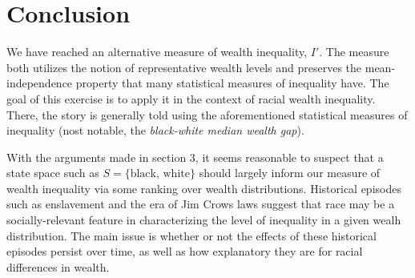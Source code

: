 \documentclass[\econtexRoot/IneqMeas]{subfiles}
\begin{document}
\onlyinsubfile{\setcounter{section}{6}}
\section{Conclusion}

\par We have reached an alternative measure of wealth inequality, $I'$. The measure both utilizes the notion of representative wealth levels and preserves the mean-independence property that many statistical measures of inequality have. The goal of this exercise is to apply it in the context of racial wealth inequality. There, the story is generally told using the aforementioned statistical measures of inequality (nost notable, the \textit{black-white median wealth gap}).

\par With the arguments made in section $3$, it seems reasonable to suspect that a state space such as $S=\{\text{black, white}\}$ should largely inform our measure of wealth inequality via some ranking over wealth distributions. Historical episodes such as enslavement and the era of Jim Crows laws suggest that race may be a socially-relevant feature in characterizing the level of inequality in a given wealh distribution. The main issue is whether or not the effects of these historical episodes persist over time, as well as how explanatory they are for racial differences in wealth.
\end{document}
